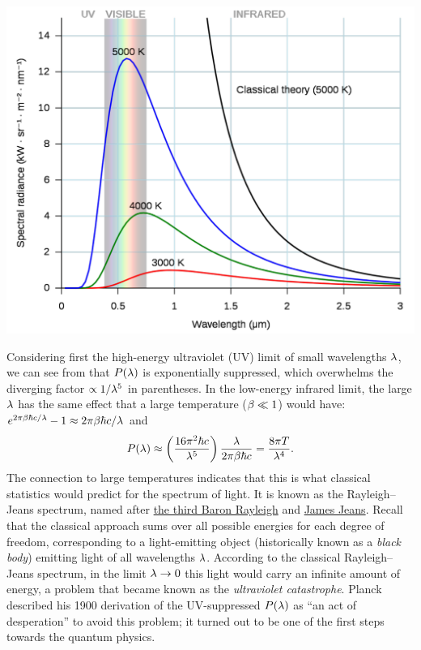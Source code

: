 \begin{center}\includegraphics[width=\textwidth]{figs/unit08_spectrum.pdf}\end{center}

Considering first the high-energy ultraviolet (UV) limit of small wavelengths $\lambda$, we can see from  that $P(\lambda)$ is exponentially suppressed, which overwhelms the diverging factor $\propto 1 / \lambda^5$ in parentheses.
In the low-energy infrared limit, the large $\lambda$ has the same effect that a large temperature ($\beta \ll 1$) would have: $e^{2\pi\beta \hbar c / \lambda} - 1 \approx 2\pi\beta \hbar c / \lambda$ and
\begin{equation*}
  P(\lambda) \approx \left(\frac{16\pi^2 \hbar c}{\lambda^5}\right) \frac{\lambda}{2\pi\beta \hbar c} = \frac{8\pi T}{\lambda^4}.
\end{equation*}
The connection to large temperatures indicates that this is what classical statistics would predict for the spectrum of light.
It is known as the Rayleigh--Jeans spectrum, named after \href{https://en.wikipedia.org/wiki/John_William_Strutt,_3rd_Baron_Rayleigh}{the third Baron Rayleigh} and \href{https://en.wikipedia.org/wiki/James_Jeans}{James Jeans}.
Recall that the classical approach sums over all possible energies for each degree of freedom, corresponding to a light-emitting object (historically known as a \textit{black body}) emitting light of all wavelengths $\lambda$.
According to the classical Rayleigh--Jeans spectrum, in the limit $\lambda \to 0$ this light would carry an infinite amount of energy, a problem that became known as the \textit{ultraviolet catastrophe}.
Planck described his 1900 derivation of the UV-suppressed $P(\lambda)$ as ``an act of desperation'' to avoid this problem; it turned out to be one of the first steps towards the quantum physics.

